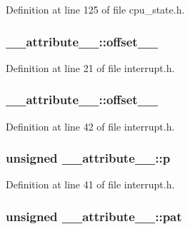 \-Definition at line 125 of file cpu\-\_\-state.\-h.

\hypertarget{struct____attribute_____a3d04130dfc91d2471628ac437c651a76}{
\subsubsection[{offset\-\_\-0\-\_\-15}]{ {\bf \-\_\-\-\_\-attribute\-\_\-\-\_\-\-::offset\-\_\-\_}}}\label{struct____attribute_____a3d04130dfc91d2471628ac437c651a76}


\-Definition at line 21 of file interrupt.\-h.

\hypertarget{struct____attribute_____a0802af6af010d868e2f962ac4ec60d27}{
\subsubsection[{offset\-\_\-16\-\_\-31}]{ {\bf \-\_\-\-\_\-attribute\-\_\-\-\_\-\-::offset\-\_\-\_}}}\label{struct____attribute_____a0802af6af010d868e2f962ac4ec60d27}


\-Definition at line 42 of file interrupt.\-h.

\hypertarget{struct____attribute_____a2021bc70d7ad9c31d8feb1177892aa23}{
\subsubsection[{p}]{\setlength{\rightskip}{0pt plus 5cm}unsigned {\bf \-\_\-\-\_\-attribute\-\_\-\-\_\-\-::p}}}\label{struct____attribute_____a2021bc70d7ad9c31d8feb1177892aa23}


\-Definition at line 41 of file interrupt.\-h.

\hypertarget{struct____attribute_____a88f7cfc63b53846d4c67a3b0797134ef}{
\subsubsection[{pat}]{\setlength{\rightskip}{0pt plus 5cm}unsigned {\bf \-\_\-\-\_\-attribute\-\_\-\-\_\-\-::pat}}}\label{struct____attribute_____a88f7cfc63b53846d4c67a3b0797134ef}


